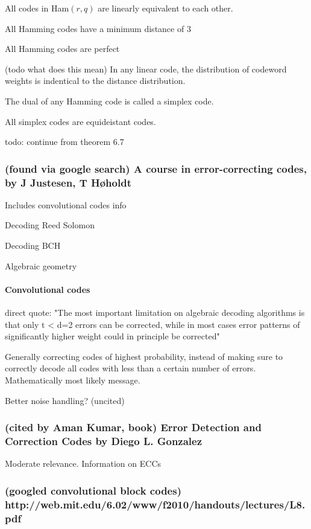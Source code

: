 \documentclass{article}
\begin{document}
All codes in Ham$(r,q)$ are linearly equivalent to each other.

All Hamming codes have a minimum distance of 3

All Hamming codes are perfect

(todo what does this mean) In any linear code, the distribution of codeword weights is indentical to the distance distribution.

The dual of any Hamming code is called a simplex code. 	

All simplex codes are equideistant codes.

todo: continue from theorem 6.7

\subsubsection{(found via google search) A course in error-correcting codes, by J Justesen, T Høholdt }

Includes convolutional codes info

Decoding Reed Solomon

Decoding BCH

Algebraic geometry

\paragraph{Convolutional codes}

direct quote: "The most important limitation on algebraic decoding algorithms is that only t < d=2 errors can be corrected, while in most cases error patterns of significantly higher weight could in principle be corrected"

Generally correcting codes of highest probability, instead of making sure to correctly decode all codes with less than a certain number of errors. Mathematically most likely message.

Better noise handling? (uncited)

\subsubsection{(cited by Aman Kumar, book) Error Detection and Correction Codes by Diego L. Gonzalez}

Moderate relevance. Information on ECCs

\subsubsection{(googled convolutional block codes) http://web.mit.edu/6.02/www/f2010/handouts/lectures/L8.pdf}
\end{document}

